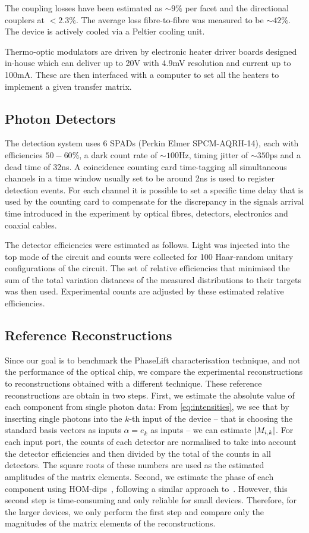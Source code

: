 The coupling losses have been estimated as $\sim 9\%$ per facet and the directional couplers at $<2.3\%$.
The average loss fibre-to-fibre was measured to be $\sim 42\%$.
The device is actively cooled via a Peltier cooling unit.

Thermo-optic modulators are driven by electronic heater driver boards designed in-house which can deliver up to 20V with 4.9mV resolution and current up to 100mA.
These are then interfaced with a computer to set all the heaters to implement a given transfer matrix.

\subsection{Photon Detectors}
The detection system uses 6 SPADs (Perkin Elmer SPCM-AQRH-14), each with efficiencies $50-60\%$, a dark count rate of $\sim 100$Hz, timing jitter of $\sim 350$ps and a dead time of 32ns.
A coincidence counting card time-tagging all simultaneous channels in a time window usually set to be around 2ns is used to register detection events.
For each channel it is possible to set a specific time delay that is used by the counting card to compensate for the discrepancy in the signals arrival time introduced in the experiment by optical fibres, detectors, electronics and coaxial cables.

The detector efficiencies were estimated as follows.
Light was injected into the top mode of the circuit and counts were collected for 100 Haar-random unitary configurations of the circuit.
The set of relative efficiencies that minimised the sum of the total variation distances of the measured distributions to their targets was then used.
Experimental counts are adjusted by these estimated relative efficiencies.

\subsection{Reference Reconstructions}

Since our goal is to benchmark the PhaseLift characterisation technique, and not the performance of the optical chip, we compare the experimental reconstructions to reconstructions obtained with a different technique.
These reference reconstructions are obtain in two steps.
First, we estimate the absolute value of each component from single photon data:
From \cref{eq:intensities}, we see that by inserting single photons into the $k$-th input of the device -- that is choosing the standard basis vectors as inputs $\alpha =  e_k$ as inputs --  we can estimate ${\vert M_{i,k}\vert}$.
For each input port, the counts of each detector are normalised to take into account the detector efficiencies and then divided by the total of the counts in all detectors.
The square roots of these numbers are used as the estimated amplitudes of the matrix elements.
Second, we estimate the phase of each component using HOM-dips~\cite{Hong_1987_Measurement}, following a similar approach to~\cite{laing_super-stable_2012, Dhand2016}.
However, this second step is time-consuming and only reliable for small devices.
Therefore, for the larger devices, we only perform the first step and compare only the magnitudes of the matrix elements of the reconstructions.

